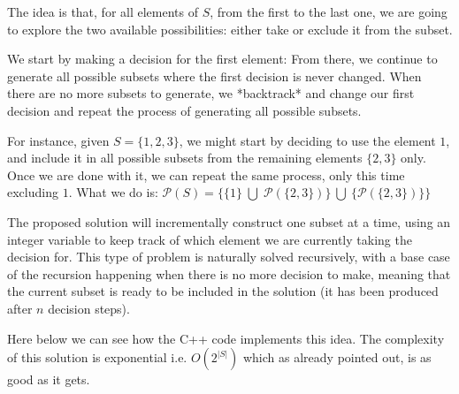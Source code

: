 The idea is that, for all elements of $S$, from the first to the last one, we are going to
explore the two available possibilities: either take or exclude
it from the subset.

We start by making a decision for the first element: From there, we continue to generate all possible subsets
where the first decision is never changed. 
When there are no more subsets to generate, we *backtrack* and change our first
decision and repeat the process of generating all possible subsets.


For instance, given $S=\{1,2,3\}$, we might start by deciding to use the element $1$, and include it in all possible subsets from the remaining elements $\{2, 3\}$ only. 
Once we are done with it, we can repeat the same process, only this time excluding $1$. What we do is: $\mathcal{P}(S)= \{\{1\} \; \bigcup \;\mathcal{P}(\{2,3\})\} \: \bigcup \: \{\mathcal{P}(\{2,3\})\}\} 
$

The proposed solution will incrementally construct one subset at a time, 
using an integer variable to keep track of which element we are currently taking the decision for.
This type of problem is naturally solved recursively, with a base case of the recursion happening when there is no more decision
to make, meaning that the current subset is ready to be included in the solution (it has been
produced after $n$ decision steps).

Here below we can see how the C++ code implements this idea. The complexity of this solution is exponential i.e. $O(2^{|S|})$ which as already pointed out, is as good as
it gets.







